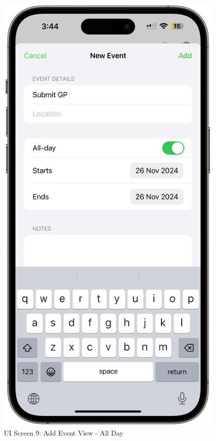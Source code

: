 \begin{figure}[!h]
    \begin{minipage}{0.3\textwidth}
        \centering
        \includegraphics[width=\textwidth]{images/screen9.png}
        \caption{UI Screen 9: Add Event View - All Day}

\end{minipage}
\end{figure}
